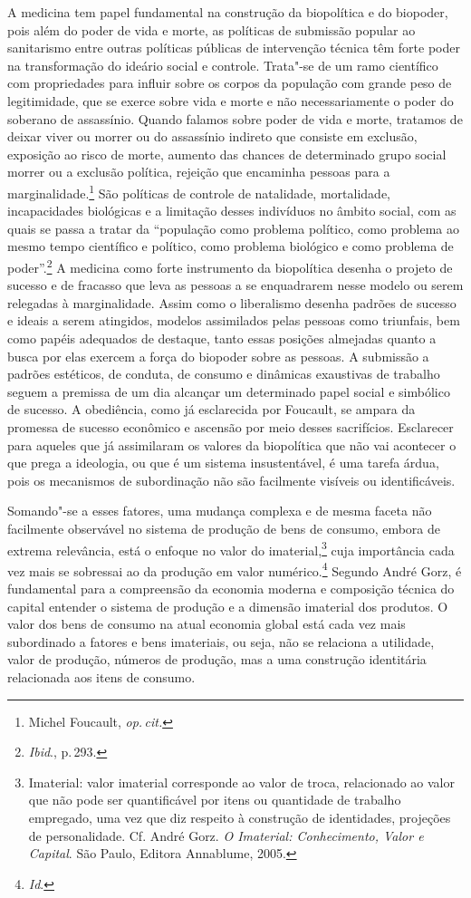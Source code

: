 A medicina tem papel fundamental na construção da biopolítica e do
biopoder, pois além do poder de vida e morte, as políticas de submissão
popular ao sanitarismo entre outras políticas públicas de intervenção
técnica têm forte poder na transformação do ideário social e controle.
Trata"-se de um ramo científico com propriedades para influir sobre os
corpos da população com grande peso de legitimidade, que se exerce sobre
vida e morte e não necessariamente o poder do soberano de assassínio.
Quando falamos sobre poder de vida e morte, tratamos de deixar viver ou
morrer ou do assassínio indireto que consiste em exclusão, exposição ao
risco de morte, aumento das chances de determinado grupo social morrer
ou a exclusão política, rejeição que encaminha pessoas para a
marginalidade.\footnote{Michel Foucault, \textit{op.\,cit.}} São políticas de controle de natalidade,
mortalidade, incapacidades biológicas e a limitação desses indivíduos no
âmbito social, com as quais se passa a tratar da ``população como
problema político, como problema ao mesmo tempo científico e político,
como problema biológico e como problema de poder''.\footnote{\textit{Ibid}., p.\,293.} A medicina como
forte instrumento da biopolítica desenha o projeto de sucesso e de
fracasso que leva as pessoas a se enquadrarem nesse modelo ou serem
relegadas à marginalidade. Assim como o liberalismo desenha padrões de
sucesso e ideais a serem atingidos, modelos assimilados pelas pessoas
como triunfais, bem como papéis adequados de destaque, tanto essas
posições almejadas quanto a busca por elas exercem a força do biopoder
sobre as pessoas. A submissão a padrões estéticos, de conduta, de
consumo e dinâmicas exaustivas de trabalho seguem a premissa de um dia
alcançar um determinado papel social e simbólico de sucesso. A
obediência, como já esclarecida por Foucault, se ampara da promessa
de sucesso econômico e ascensão por meio desses sacrifícios. Esclarecer
para aqueles que já assimilaram os valores da biopolítica que não vai
acontecer o que prega a ideologia, ou que é um sistema insustentável, é
uma tarefa árdua, pois os mecanismos de subordinação não são facilmente
visíveis ou identificáveis.

Somando"-se a esses fatores, uma mudança complexa e de mesma faceta não
facilmente observável no sistema de produção de bens de consumo, embora
de extrema relevância, está o enfoque no valor do imaterial,\footnote{Imaterial:
  valor imaterial corresponde ao valor de troca, relacionado ao valor
  que não pode ser quantificável por itens ou quantidade de trabalho
  empregado, uma vez que diz respeito à construção de identidades,
  projeções de personalidade. Cf. André Gorz. \emph{O Imaterial: Conhecimento, Valor e Capital}. São Paulo, Editora Annablume, 2005.} cuja importância cada vez
mais se sobressai ao da produção em valor numérico.\footnote{\textit{Id}.} Segundo
André Gorz, é fundamental para a compreensão da economia moderna e
composição técnica do capital entender o sistema de produção e a
dimensão imaterial dos produtos. O valor dos bens de consumo na atual
economia global está cada vez mais subordinado a fatores e bens
imateriais, ou seja, não se relaciona a utilidade, valor de produção,
números de produção, mas a uma construção identitária relacionada aos
itens de consumo.

